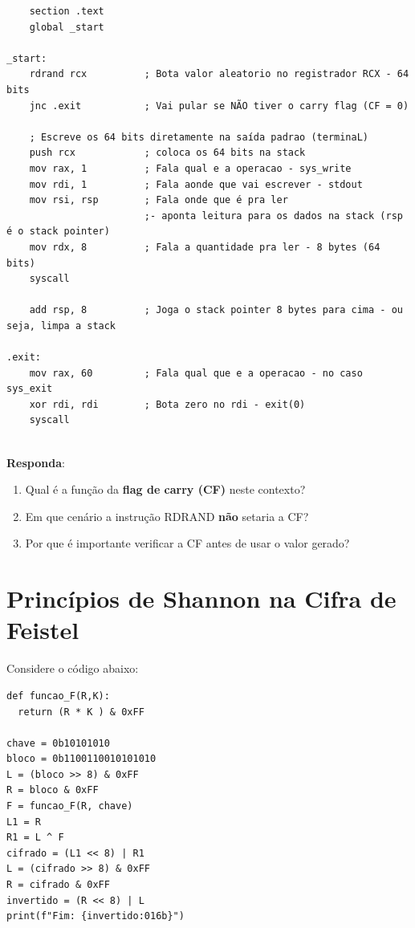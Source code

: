 \begin{verbatim}
    section .text
    global _start

_start:
    rdrand rcx          ; Bota valor aleatorio no registrador RCX - 64 bits
    jnc .exit           ; Vai pular se NÃO tiver o carry flag (CF = 0)

    ; Escreve os 64 bits diretamente na saída padrao (terminaL)
    push rcx            ; coloca os 64 bits na stack
    mov rax, 1          ; Fala qual e a operacao - sys_write
    mov rdi, 1          ; Fala aonde que vai escrever - stdout
    mov rsi, rsp        ; Fala onde que é pra ler 
                        ;- aponta leitura para os dados na stack (rsp é o stack pointer)
    mov rdx, 8          ; Fala a quantidade pra ler - 8 bytes (64 bits)
    syscall

    add rsp, 8          ; Joga o stack pointer 8 bytes para cima - ou seja, limpa a stack

.exit:
    mov rax, 60         ; Fala qual que e a operacao - no caso sys_exit
    xor rdi, rdi        ; Bota zero no rdi - exit(0)
    syscall
    
\end{verbatim}

\textbf{Responda}:
\begin{enumerate}
    \item Qual é a função da \textbf{flag de carry (CF)} neste contexto?
    \item Em que cenário a instrução RDRAND \textbf{não} setaria a CF?
    \item Por que é importante verificar a CF antes de usar o valor gerado?
\end{enumerate}



\section{Princípios de Shannon na Cifra de Feistel}

Considere o código abaixo:
\begin{verbatim}
def funcao_F(R,K):
  return (R * K ) & 0xFF

chave = 0b10101010                   
bloco = 0b1100110010101010   
L = (bloco >> 8) & 0xFF
R = bloco & 0xFF 
F = funcao_F(R, chave)
L1 = R
R1 = L ^ F
cifrado = (L1 << 8) | R1 
L = (cifrado >> 8) & 0xFF
R = cifrado & 0xFF
invertido = (R << 8) | L
print(f"Fim: {invertido:016b}")      
\end{verbatim}

